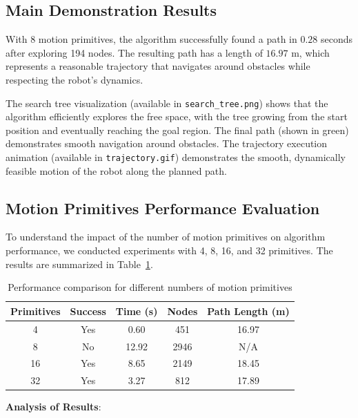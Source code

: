 \documentclass[11pt]{article}
\begin{document}
\subsection{Main Demonstration Results}

With 8 motion primitives, the algorithm successfully found a path in $0.28$ seconds after exploring 194 nodes. The resulting path has a length of $16.97$ m, which represents a reasonable trajectory that navigates around obstacles while respecting the robot's dynamics.

The search tree visualization (available in \texttt{search\_tree.png}) shows that the algorithm efficiently explores the free space, with the tree growing from the start position and eventually reaching the goal region. The final path (shown in green) demonstrates smooth navigation around obstacles. The trajectory execution animation (available in \texttt{trajectory.gif}) demonstrates the smooth, dynamically feasible motion of the robot along the planned path.

\subsection{Motion Primitives Performance Evaluation}

To understand the impact of the number of motion primitives on algorithm performance, we conducted experiments with 4, 8, 16, and 32 primitives. The results are summarized in Table~\ref{tab:primitives}.

\begin{table}[H]
\centering
\begin{tabular}{|c|c|c|c|c|}
\hline
\textbf{Primitives} & \textbf{Success} & \textbf{Time (s)} & \textbf{Nodes} & \textbf{Path Length (m)} \\
\hline
4 & Yes & 0.60 & 451 & 16.97 \\
8 & No & 12.92 & 2946 & N/A \\
16 & Yes & 8.65 & 2149 & 18.45 \\
32 & Yes & 3.27 & 812 & 17.89 \\
\hline
\end{tabular}
\caption{Performance comparison for different numbers of motion primitives}
\label{tab:primitives}
\end{table}

\textbf{Analysis of Results}:
\end{document}
